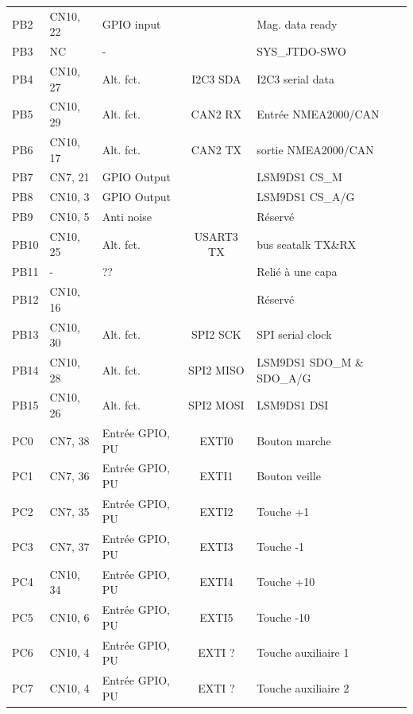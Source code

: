 \documentclass[a4paper,11pt]{report}
\begin{document}
\begin{tabular}{|l|l|l|c|l|}
   PB2  & CN10, 22  & GPIO input        &             & Mag. data ready       \\
   PB3  & NC        & -                 &             & SYS\_JTDO-SWO          \\
   PB4  & CN10, 27  & Alt. fct. \no 4   & I2C3 SDA    & I2C3 serial data      \\
   PB5  & CN10, 29  & Alt. fct. \no 9   & CAN2 RX     & Entrée NMEA2000/CAN   \\
   PB6  & CN10, 17  & Alt. fct. \no 9   & CAN2 TX     & sortie NMEA2000/CAN   \\
   PB7  & CN7,  21  & GPIO Output       &             & LSM9DS1 CS\_M          \\
   PB8  & CN10,  3  & GPIO Output       &             & LSM9DS1 CS\_A/G        \\
   PB9  & CN10,  5  & Anti noise        &             & Réservé               \\
   PB10 & CN10, 25  & Alt. fct. \no 7   & USART3 TX   & bus seatalk TX\&RX    \\
   PB11 & -         & ??                &             & Relié à une capa      \\
   PB12 & CN10, 16  &                   &             & Réservé               \\
   PB13 & CN10, 30  & Alt. fct. \no 5   & SPI2 SCK    & SPI serial clock      \\
   PB14 & CN10, 28  & Alt. fct. \no 5   & SPI2 MISO   & LSM9DS1 SDO\_M \& SDO\_A/G \\
   PB15 & CN10, 26  & Alt. fct. \no 5   & SPI2 MOSI   & LSM9DS1 DSI           \\ 
   \hline
   PC0  &  CN7,  38 & Entrée GPIO, PU   & EXTI0       & Bouton marche         \\
   PC1  &  CN7,  36 & Entrée GPIO, PU   & EXTI1       & Bouton veille         \\
   PC2  &  CN7,  35 & Entrée GPIO, PU   & EXTI2       & Touche +1             \\
   PC3  &  CN7,  37 & Entrée GPIO, PU   & EXTI3       & Touche -1             \\
   PC4  &  CN10, 34 & Entrée GPIO, PU   & EXTI4       & Touche +10            \\
   PC5  &  CN10, 6  & Entrée GPIO, PU   & EXTI5       & Touche -10            \\
   PC6  &  CN10, 4  & Entrée GPIO, PU   & EXTI ?      & Touche auxiliaire 1   \\
   PC7  &  CN10, 4  & Entrée GPIO, PU   & EXTI ?      & Touche auxiliaire 2   \\

\end{tabular}
\end{document}
